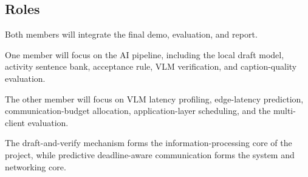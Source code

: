 \subsection{Roles}

Both members will integrate the final demo, evaluation, and report.

One member will focus on the AI pipeline, including the local draft model,
activity sentence bank, acceptance rule, VLM verification, and caption-quality
evaluation.

The other member will focus on VLM latency profiling, edge-latency prediction,
communication-budget allocation, application-layer scheduling, and the
multi-client evaluation.

The draft-and-verify mechanism forms the information-processing core of the
project, while predictive deadline-aware communication forms the system and
networking core.